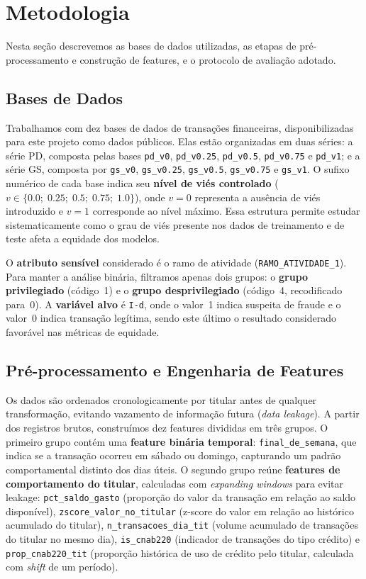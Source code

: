 \section{Metodologia}
\label{sec:metodologia}

Nesta seção descrevemos as bases de dados utilizadas, as etapas de pré-processamento e construção de features, e o protocolo de avaliação adotado.

\subsection{Bases de Dados}

Trabalhamos com dez bases de dados de transações financeiras, disponibilizadas para este projeto como dados públicos. Elas estão organizadas em duas séries: a série PD, composta pelas bases \texttt{pd\_v0}, \texttt{pd\_v0.25}, \texttt{pd\_v0.5}, \texttt{pd\_v0.75} e \texttt{pd\_v1}; e a série GS, composta por \texttt{gs\_v0}, \texttt{gs\_v0.25}, \texttt{gs\_v0.5}, \texttt{gs\_v0.75} e \texttt{gs\_v1}. O sufixo numérico de cada base indica seu \textbf{nível de viés controlado} ($v \in \{0.0;\; 0.25;\; 0.5;\; 0.75;\; 1.0\}$), onde $v = 0$ representa a ausência de viés introduzido e $v = 1$ corresponde ao nível máximo. Essa estrutura permite estudar sistematicamente como o grau de viés presente nos dados de treinamento e de teste afeta a equidade dos modelos.

O \textbf{atributo sensível} considerado é o ramo de atividade (\texttt{RAMO\_ATIVIDADE\_1}). Para manter a análise binária, filtramos apenas dois grupos: o \textbf{grupo privilegiado} (código~1) e o \textbf{grupo desprivilegiado} (código~4, recodificado para~0). A \textbf{variável alvo} é \texttt{I-d}, onde o valor~1 indica suspeita de fraude e o valor~0 indica transação legítima, sendo este último o resultado considerado favorável nas métricas de equidade.

\subsection{Pré-processamento e Engenharia de Features}

Os dados são ordenados cronologicamente por titular antes de qualquer transformação, evitando vazamento de informação futura (\textit{data leakage}). A partir dos registros brutos, construímos dez features divididas em três grupos. O primeiro grupo contém uma \textbf{feature binária temporal}: \texttt{final\_de\_semana}, que indica se a transação ocorreu em sábado ou domingo, capturando um padrão comportamental distinto dos dias úteis. O segundo grupo reúne \textbf{features de comportamento do titular}, calculadas com \textit{expanding windows} para evitar leakage: \texttt{pct\_saldo\_gasto} (proporção do valor da transação em relação ao saldo disponível), \texttt{zscore\_valor\_no\_titular} (z-score do valor em relação ao histórico acumulado do titular), \texttt{n\_transacoes\_dia\_tit} (volume acumulado de transações do titular no mesmo dia), \texttt{is\_cnab220} (indicador de transações do tipo crédito) e \texttt{prop\_cnab220\_tit} (proporção histórica de uso de crédito pelo titular, calculada com \textit{shift} de um período).

